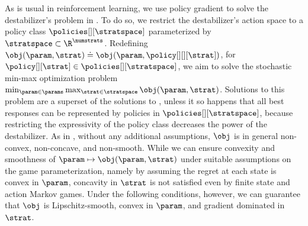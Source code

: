 As is usual in reinforcement learning, we use policy gradient to solve the destabilizer's problem in .
To do so, we restrict the destabilizer's action space to a policy class $\policies[][\stratspace]$ parameterized by $\stratspace \subset \R^\numstrats$.
Redefining $\obj (\param, \strat) \doteq \obj (\param, \policy[][][\strat])$, for $\policy[][\strat] \in \policies[][\stratspace]$, we aim to solve the stochastic min-max optimization problem $\min_{\param \in \params} \max_{\strat \in \stratspace} \obj (\param, \strat)$. 
Solutions to this problem are a superset   of the solutions to ,
unless it so happens that all best responses can be represented by policies in $\policies[][\stratspace]$, 
because restricting the expressivity of the policy class decreases the power of the destabilizer.
As in , without any additional assumptions, $\obj$ is in general non-convex, non-concave, and non-smooth.
While we can ensure convexity and smoothness of $\param \mapsto \obj (\param, \strat)$ under suitable assumptions on the game parameterization, namely by assuming the regret at each state is convex in $\param$, concavity in $\strat$ is not satisfied even by finite state and action Markov games. 
Under the following conditions, however, we can guarantee that $\obj$ is Lipschitz-smooth,
convex in $\param$, and gradient dominated in $\strat$.

